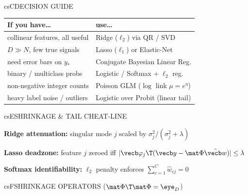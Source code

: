 \documentclass[../../../../master.tex]{subfiles}
\begin{document}
\begin{cscolumns}
\begin{cscard}{csC}{DECISION GUIDE}
  \renewcommand{\arraystretch}{1.22}\small
  \begin{tabular}{@{}>{\raggedright\arraybackslash}p{3.2cm}>{\raggedright\arraybackslash}p{4.6cm}@{}}
    \textbf{If you have\ldots} & \textbf{use\ldots}\\ \hline
    collinear features, all useful & Ridge ($\ell_2$) via QR / SVD\\
    $D\gg N$, few true signals & Lasso ($\ell_1$) or Elastic-Net\\
    need error bars on $y_*$ & Conjugate Bayesian Linear Reg.\\
    binary / multiclass probs & Logistic / Softmax $+\;\ell_2$ reg.\\
    non-negative integer counts & Poisson GLM ($\log$ link $\mu=e^\eta$)\\
    heavy label noise / outliers & Logistic over Probit (linear tail)\\
  \end{tabular}
\end{cscard}

\begin{cscard}{csE}{SHRINKAGE \& TAIL CHEAT-LINE}
  \begin{csbul}
    \item \textbf{Ridge attenuation:} singular mode $j$ scaled by $\sigma_j^2/(\sigma_j^2+\lambda)$
    \item \textbf{Lasso deadzone:} feature $j$ zeroed iff $|\vecb\varphi_j\T(\vecb y-\mat\Phi\hat{\vecb w})|\le\lambda$
    \item \textbf{Softmax identifiability:} $\ell_2$ penalty enforces $\sum_{c=1}^C\hat w_{cj}=0$
  \end{csbul}
\end{cscard}

\begin{cscard}{csF}{SHRINKAGE OPERATORS ($\mat\Phi\T\mat\Phi=\eye_D$)}
  \centering
\end{cscard}
\columnbreak


\end{cscolumns}
\end{document}
